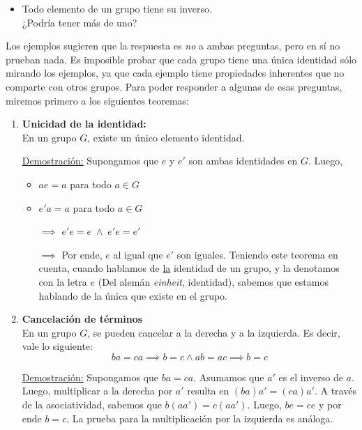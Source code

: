 \documentclass[../main.tex]{subfiles}
\begin{document}
{{\begin{itemize}
            \item Todo elemento de un grupo tiene su inverso. 
            \\ ¿Podría tener más de uno?
        \end{itemize}
        
        Los ejemplos sugieren que la respuesta es \textit{no} a ambas preguntas, pero en sí no prueban nada. Es imposible probar que cada grupo tiene una única identidad sólo mirando los ejemplos, ya que cada ejemplo tiene propiedades inherentes que no comparte con otros grupos. Para poder responder a algunas de esas preguntas, miremos primero a los siguientes teoremas:
        
        \begin{enumerate}
            \item \textbf{Unicidad de la identidad:} \\
            En un grupo $G$, existe un único elemento identidad.
            
            \newpage
            \ul{Demostración:}
            Supongamos que $e$ y $e'$ son ambas identidades en $G$. Luego,
            \begin{itemize}
                \item $ae = a$ para todo $a \in G$
                \item $e'a = a$ para todo $a \in G$
                \item[$\implies$] $e'e = e \; \land \; e'e = e'$
                \item[$\implies$] Por ende, $e$ al igual que $e'$ son iguales. Teniendo este teorema en cuenta, cuando hablamos de \ul{la} identidad de un grupo, y la denotamos con la letra $e$ (Del alemán \textit{einheit}, identidad), sabemos que estamos hablando de la única que existe en el grupo.
            \end{itemize}
            
            \item \textbf{Cancelación de términos} \\
            En un grupo $G$, se pueden cancelar a la derecha y a la izquierda. Es decir, vale lo siguiente:
            \begin{equation*}
                ba = ca \implies b = c \land ab = ac \implies b = c
            \end{equation*}
            
            \ul{Demostración:}
            Supongamos que $ba = ca$. Asumamos que $a'$ es el inverso de $a$. Luego, multiplicar a la derecha por $a'$ resulta en $(ba)a' = (ca)a'$. A través de la asociatividad, sabemos que $b(aa') = c(aa')$. Luego, $be = ce$ y por ende $b = c$. La prueba para la multiplicación por la izquierda es análoga.
            

\end{enumerate}}}
\end{document}
